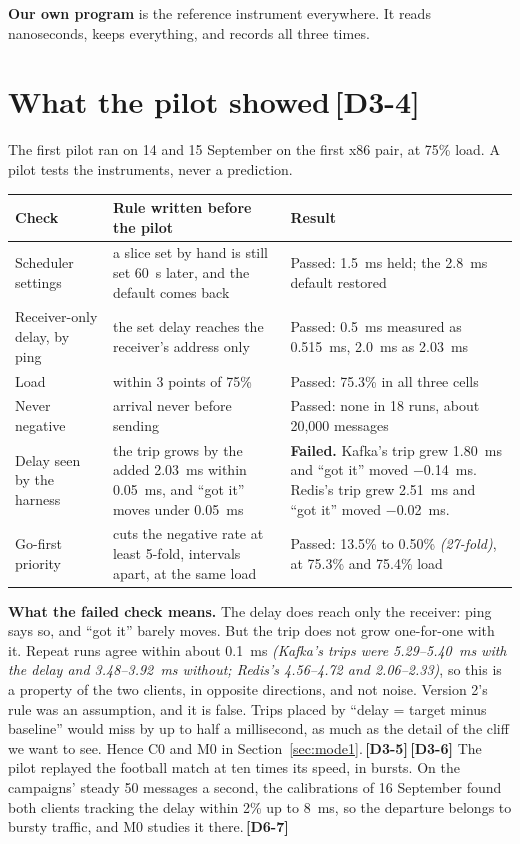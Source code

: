 \documentclass[11pt]{article}
\newcommand{\gl}[1]{{\color{soft}\itshape\small (#1)}}
\newcommand{\chg}[1]{\,{\color{chgcol}\bfseries\footnotesize[#1]}}
\newcommand{\chgold}[1]{\,{\color{oldcol}\bfseries\footnotesize[#1]}}
\begin{document}
\textbf{Our own program} is the reference instrument everywhere. It reads nanoseconds, keeps everything, and records all three times.

\section[What the pilot showed]{What the pilot showed\protect\chgold{D3-4}}\label{sec:pilot}
The first pilot ran on 14 and 15 September on the first x86 pair, at 75\% load. A pilot tests the instruments, never a prediction.

{\small
\begin{tabularx}{\linewidth}{@{}>{\raggedright\arraybackslash}p{3.0cm} >{\raggedright\arraybackslash}X >{\raggedright\arraybackslash}p{6.2cm}@{}}
\toprule
\textbf{Check} & \textbf{Rule written before the pilot} & \textbf{Result} \\
\midrule
Scheduler settings & a slice set by hand is still set 60~s later, and the default comes back & Passed: 1.5~ms held; the 2.8~ms default restored \\
Receiver-only delay, by ping & the set delay reaches the receiver's address only & Passed: 0.5~ms measured as 0.515~ms, 2.0~ms as 2.03~ms \\
Load & within 3 points of 75\% & Passed: 75.3\% in all three cells \\
Never negative & arrival never before sending & Passed: none in 18 runs, about 20,000 messages \\
Delay seen by the harness & the trip grows by the added 2.03~ms within 0.05~ms, and ``got it'' moves under 0.05~ms & \textbf{Failed.} Kafka's trip grew 1.80~ms and ``got it'' moved $-$0.14~ms. Redis's trip grew 2.51~ms and ``got it'' moved $-$0.02~ms. \\
Go-first priority & cuts the negative rate at least 5-fold, intervals apart, at the same load & Passed: 13.5\% to 0.50\% \gl{27-fold}, at 75.3\% and 75.4\% load \\
\bottomrule
\end{tabularx}}

\textbf{What the failed check means.} The delay does reach only the receiver: ping says so, and ``got it'' barely moves. But the trip does not grow one-for-one with it. Repeat runs agree within about 0.1~ms \gl{Kafka's trips were 5.29--5.40~ms with the delay and 3.48--3.92~ms without; Redis's 4.56--4.72 and 2.06--2.33}, so this is a property of the two clients, in opposite directions, and not noise. Version 2's rule was an assumption, and it is false. Trips placed by ``delay = target minus baseline'' would miss by up to half a millisecond, as much as the detail of the cliff we want to see. Hence C0 and M0 in Section~\ref{sec:mode1}.\chgold{D3-5}\chgold{D3-6} The pilot replayed the football match at ten times its speed, in bursts. On the campaigns' steady 50 messages a second, the calibrations of 16 September found both clients tracking the delay within 2\% up to 8~ms, so the departure belongs to bursty traffic, and M0 studies it there.\chg{D6-7}
\end{document}
